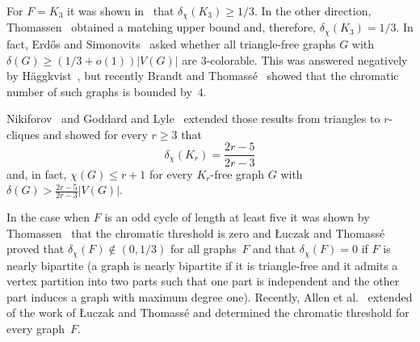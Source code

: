 \documentclass[reqno, 12pt]{amsart}
\theoremstyle{plain}
\theoremstyle{definition}
\begin{document}
For $F=K_3$ it was shown in~\cite{ES73} 
that $\delta_{\chi}(K_3)\geq 1/3$. In the other direction, Thomassen~\cite{T_C02} obtained a matching upper bound and,
therefore, $\delta_{\chi}(K_3)=1/3$.
In fact, Erd\H{o}s and Simonovits~\cite{ES73} asked whether all triangle-free graphs $G$
with $\delta(G)\geq(1/3+o(1))|V(G)|$ are 3-colorable. 
This was answered negatively by H\"aggkvist~\cite{H82}, but recently Brandt and Thomass\'e~\cite{BT}  showed that the 
chromatic number of such graphs is bounded by~$4$. 

Nikiforov~\cite{N10} and Goddard and Lyle~\cite{GL10} extended those results from triangles to $r$-cliques
and showed for every $r\geq3$ that
\begin{equation}\label{eq:dchir}
	\delta_{\chi}(K_r) = \frac{2r-5}{2r-3}
\end{equation}
and, in fact,  $\chi(G)\leq r+1$ for every 
$K_r$-free graph $G$ with $\delta(G)>\frac{2r-5}{2r-3}|V(G)|$.

In the case when $F$ is an odd cycle of length at least five it was shown by Thomassen~\cite{T_C07} that 
the chromatic threshold is zero and \L uczak and Thomass\'e~\cite{LT10} proved that 
$\delta_{\chi}(F)\not\in(0,1/3)$ for all graphs~$F$ and that $\delta_{\chi}(F)=0$ if $F$ is nearly bipartite 
(a graph is nearly bipartite if it is triangle-free and it admits a vertex partition into two parts
such that one part is independent and the other part induces a graph with maximum degree one).
Recently, Allen et al.~\cite{ABK} extended of the work of \L uczak and Thomass\'e and determined 
the chromatic threshold for every graph~$F$.
\end{document}
